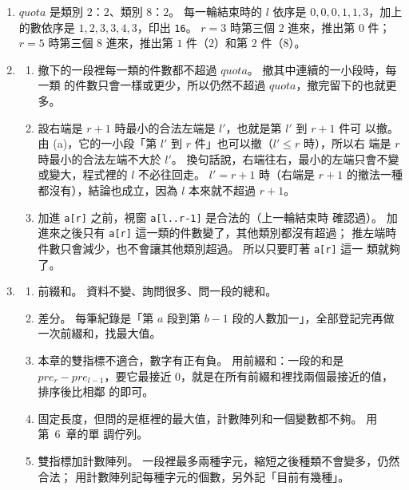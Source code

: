 \begin{enumerate}
\item $quota$ 是類別 $2$：$2$、類別 $8$：$2$。 每一輪結束時的 $l$ 依序是
$0, 0, 0, 1, 1, 3$，加上的數依序是 $1, 2, 3, 3, 4, 3$，印出 \texttt{16}。
$r = 3$ 時第三個 $2$ 進來，推出第 $0$ 件；$r = 5$ 時第三個 $8$ 進來，推出第
$1$ 件（$2$）和第 $2$ 件（$8$）。

\item
\begin{enumerate}
\item 撤下的一段裡每一類的件數都不超過 $quota$。 撤其中連續的一小段時，每一類
的件數只會一樣或更少，所以仍然不超過 $quota$，撤完留下的也就更多。
\item 設右端是 $r + 1$ 時最小的合法左端是 $l'$，也就是第 $l'$ 到 $r + 1$ 件可
以撤。 由 (a)，它的一小段「第 $l'$ 到 $r$ 件」也可以撤（$l' \le r$ 時），所以右
端是 $r$ 時最小的合法左端不大於 $l'$。 換句話說，右端往右，最小的左端只會不變
或變大，程式裡的 $l$ 不必往回走。 $l' = r + 1$ 時（右端是 $r + 1$ 的撤法一種
都沒有），結論也成立，因為 $l$ 本來就不超過 $r + 1$。
\item 加進 \texttt{a[r]} 之前，視窗 \texttt{a[l..r-1]} 是合法的（上一輪結束時
確認過）。 加進來之後只有 \texttt{a[r]} 這一類的件數變了，其他類別都沒有超過；
推左端時件數只會減少，也不會讓其他類別超過。 所以只要盯著 \texttt{a[r]} 這一
類就夠了。
\end{enumerate}

\item
\begin{enumerate}
\item 前綴和。 資料不變、詢問很多、問一段的總和。
\item 差分。 每筆紀錄是「第 $a$ 段到第 $b - 1$ 段的人數加一」，全部登記完再做
一次前綴和，找最大值。
\item 本章的雙指標不適合，數字有正有負。 用前綴和：一段的和是 $pre_r -
pre_{l-1}$，要它最接近 $0$，就是在所有前綴和裡找兩個最接近的值，排序後比相鄰
的即可。
\item 固定長度，但問的是框裡的最大值，計數陣列和一個變數都不夠。 用第~6~章的單
調佇列。
\item 雙指標加計數陣列。 一段裡最多兩種字元，縮短之後種類不會變多，仍然合法；
用計數陣列記每種字元的個數，另外記「目前有幾種」。
\end{enumerate}
\end{enumerate}
